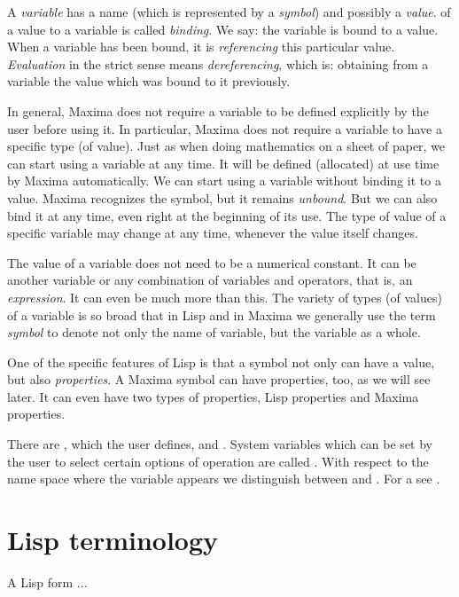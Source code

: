 \documentclass[../Maxima_Workbook.tex]{subfiles}
\begin{document}
\lz A \emph{variable} has a name (which is represented by a \emph{symbol}) and possibly a \emph{value}.  of a value to a variable is called \emph{binding}. We say: the variable is bound to a value. When a variable has been bound, it is \emph{referencing} this particular value. \emph{Evaluation} in the strict sense means \emph{dereferencing}, which is: obtaining from a variable the value which was bound to it previously.

\lz In general, Maxima does not require a variable to be defined explicitly by the user before using it. In particular, Maxima does not require a variable to have a specific type (of value). Just as when doing mathematics on a sheet of paper, we can start using a variable at any time. It will be defined (allocated) at use time by Maxima automatically. We can start using a variable without binding it to a value. Maxima recognizes the symbol, but it remains \emph{unbound}. But we can also bind it at any time, even right at the beginning of its use. The type of value of a specific variable may change at any time, whenever the value itself changes.

\lz The value of a variable does not need to be a numerical constant. It can be another variable or any combination of variables and operators, that is, an \emph{expression}. It can even be much more than this. The variety of types (of values) of a variable is so broad that in Lisp and in Maxima we generally use the term \emph{symbol} to denote not only the name of variable, but the variable as a whole.

\lz One of the specific features of Lisp is that a symbol not only can have a value, but also \emph{properties}. A Maxima symbol can have properties, too, as we will see later. It can even have two types of properties, Lisp properties and Maxima properties.

\lz There are ,  which the user defines, and . System variables which can be set by the user to select certain options of operation are called . With respect to the name space where the variable appears we distinguish between  and .  For a   see .

\section{Lisp terminology}

 

\lz A Lisp form ...
\end{document}
